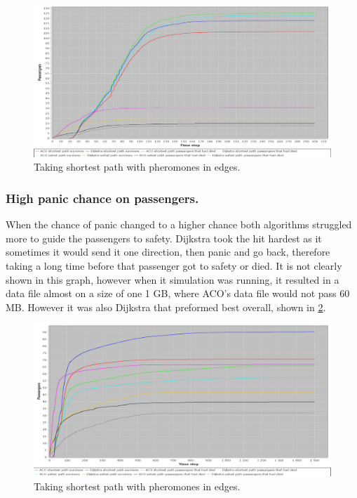 \begin{figure} [float]
\centering
\hspace*{-1.0in}
\includegraphics[scale=0.35]{images/Graph-using-200-rounds-140-passangers-and-one-hazzard-and-ACO-having-pheremons-in-edges.png}
\caption{Taking shortest path with pheromones in edges.}
\label{fig:celebPherInEdge}
\end{figure}


\subsubsection{High panic chance on passengers.}

When the chance of panic changed to a higher chance both algorithms struggled more to guide the passengers to safety. Dijkstra took the hit hardest as it sometimes it would send it one direction, then panic and go back, therefore taking a long time before that passenger got to safety or died. It is not clearly shown in this graph, however when it simulation was running, it resulted in a data file almost on a size of one 1 GB, where ACO's data file would not pass 60 MB. However it was also Dijkstra that preformed best overall, shown in \ref{fig:celebHPanic}.

\begin{figure} [float]
\centering
\hspace*{-1.0in}
\includegraphics[scale=0.35]{images/Graph-using-200-rounds-140-passangers-and-one-fire-high-panic.png}
\caption{Taking shortest path with pheromones in edges.}
\label{fig:celebHPanic}
\end{figure}


